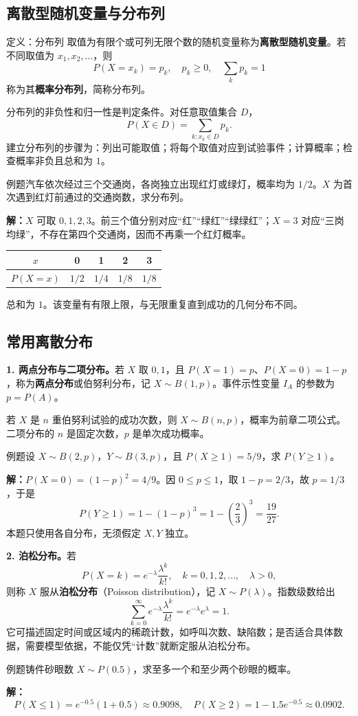 \documentclass[UTF8,fontset=none,zihao=-4,a4paper]{ctexart}
\newcommand{\term}[1]{\textbf{#1}}
\newcommand{\example}[1]{\begin{infobox}{例题}#1\end{infobox}}
\newcommand{\solution}{\par\noindent\textbf{解：}}
\begin{document}
\subsection{离散型随机变量与分布列}
\begin{infobox}{定义：分布列}
取值为有限个或可列无限个数的随机变量称为\term{离散型随机变量}。若不同取值为 $x_1,x_2,\ldots$，则
\[
P(X=x_k)=p_k,\quad p_k\ge0,\quad\sum_k p_k=1
\]
称为其\term{概率分布列}，简称分布列。
\end{infobox}
分布列的非负性和归一性是判定条件。对任意取值集合 $D$，
\[
P(X\in D)=\sum_{k:x_k\in D}p_k.
\]
建立分布列的步骤为：列出可能取值；将每个取值对应到试验事件；计算概率；检查概率非负且总和为 $1$。
\example{汽车依次经过三个交通岗，各岗独立出现红灯或绿灯，概率均为 $1/2$。$X$ 为首次遇到红灯前通过的交通岗数，求分布列。}
\solution $X$ 可取 $0,1,2,3$。前三个值分别对应“红”“绿红”“绿绿红”；$X=3$ 对应“三岗均绿”，不存在第四个交通岗，因而不再乘一个红灯概率。
\begin{center}\begin{tabular}{ccccc}\toprule
$x$&0&1&2&3\\\midrule
$P(X=x)$&$1/2$&$1/4$&$1/8$&$1/8$\\\bottomrule
\end{tabular}\end{center}
总和为 $1$。该变量有有限上限，与无限重复直到成功的几何分布不同。
\subsection{常用离散分布}
\textbf{1. 两点分布与二项分布。}若 $X$ 取 $0,1$，且 $P(X=1)=p$、$P(X=0)=1-p$，称为\term{两点分布}或伯努利分布，记 $X\sim B(1,p)$。事件示性变量 $I_A$ 的参数为 $p=P(A)$。

若 $X$ 是 $n$ 重伯努利试验的成功次数，则 $X\sim B(n,p)$，概率为前章二项公式。二项分布的 $n$ 是固定次数，$p$ 是单次成功概率。
\example{设 $X\sim B(2,p)$，$Y\sim B(3,p)$，且 $P(X\ge1)=5/9$，求 $P(Y\ge1)$。}
\solution $P(X=0)=(1-p)^2=4/9$。因 $0\le p\le1$，取 $1-p=2/3$，故 $p=1/3$，于是
\[
P(Y\ge1)=1-(1-p)^3=1-\left(\frac23\right)^3=\frac{19}{27}.
\]
本题只使用各自分布，无须假定 $X,Y$ 独立。

\textbf{2. 泊松分布。}若
\[
P(X=k)=e^{-\lambda}\frac{\lambda^k}{k!},\quad k=0,1,2,\ldots,\quad\lambda>0,
\]
则称 $X$ 服从\term{泊松分布}（Poisson distribution），记 $X\sim P(\lambda)$。指数级数给出
\[
\sum_{k=0}^{\infty}e^{-\lambda}\frac{\lambda^k}{k!}=e^{-\lambda}e^{\lambda}=1.
\]
它可描述固定时间或区域内的稀疏计数，如呼叫次数、缺陷数；是否适合具体数据，需要模型依据，不能仅凭“计数”就断定服从泊松分布。
\example{铸件砂眼数 $X\sim P(0.5)$，求至多一个和至少两个砂眼的概率。}
\solution
\[
P(X\le1)=e^{-0.5}(1+0.5)\approx0.9098,\quad
P(X\ge2)=1-1.5e^{-0.5}\approx0.0902.
\]
\end{document}
